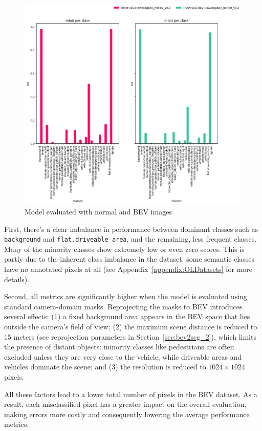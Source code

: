 \begin{figure}[h!]
    \centering
    \includegraphics[width=0.8\linewidth]{./images/experiments/raw2segbev_mit-b0_v0.2_test_evaluation.png}
    \caption{Model evaluated with normal and BEV images}
    \label{fig:normal_vs_bev_evaluation}
\end{figure}

First, there's a clear imbalance in performance between dominant classes such as \texttt{background} and \texttt{flat.driveable\_area}, and the remaining, less frequent classes. Many of the minority classes show extremely low or even zero  scores. This is partly due to the inherent class imbalance in the dataset: some semantic classes have no annotated pixels at all (see Appendix~\ref{appendix:OLDatasets} for more details).

Second, all metrics are significantly higher when the model is evaluated using standard camera-domain masks. Reprojecting the masks to BEV introduces several effects: (1) a fixed background area appears in the BEV space that lies outside the camera's field of view; (2) the maximum scene distance is reduced to 15 meters (see reprojection parameters in Section~\ref{sec:bev2seg_2}), which limits the presence of distant objects: minority classes like pedestrians are often excluded unless they are very close to the vehicle, while driveable areas and vehicles dominate the scene; and (3) the resolution is reduced to $1024 \times 1024$ pixels.

All these factors lead to a lower total number of pixels in the BEV dataset. As a result, each misclassified pixel has a greater impact on the overall evaluation, making errors more costly and consequently lowering the average performance metrics.


